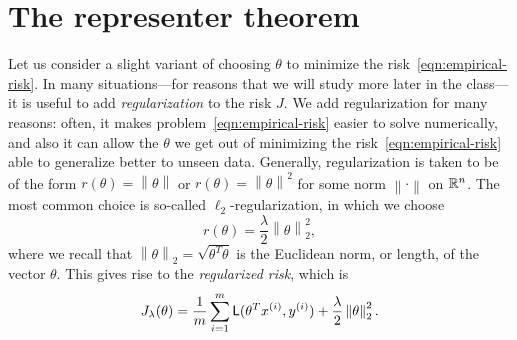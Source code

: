\documentclass{article}
\newcommand{\loss}{\mathsf{L}}
\begin{document}
\section{The representer theorem}

\renewenvironment{proof}{\noindent{\bf Proof}\hspace*{1em}}{\qed\bigskip\\}

\newcommand{\reg}{r}
\newcommand{\norm}[1]{\left\|{#1}\right\|}
\newcommand{\normbigg}[1]{\bigg\|{#1}\bigg\|}
\newcommand{\ltwo}[1]{\norm{#1}_2}
\newcommand{\ltwobigg}[1]{\normbigg{#1}_2}

Let us consider a slight variant of choosing $\theta$ to minimize the
risk~\eqref{eqn:empirical-risk}. In many situations---for reasons that we
will study more later in the class---it is useful to add
\emph{regularization} to the risk $J$. We add regularization for many
reasons: often, it makes problem~\eqref{eqn:empirical-risk} easier to solve
numerically, and also it can allow the $\theta$ we get out of minimizing the
risk~\eqref{eqn:empirical-risk} able to generalize better to unseen data.
Generally, regularization is taken to be of the form
$\reg(\theta) = \norm{\theta}$ or $\reg(\theta) = \norm{\theta}^2$ for
some norm $\norm{\cdot}$ on $\mathbb{R}^n$.
The most common choice is so-called $\ell_2$-regularization, in which
we choose
\begin{equation*}
  \reg(\theta) = \frac{\lambda}{2} \ltwo{\theta}^2,
\end{equation*}
where we recall that $\ltwo{\theta} = \sqrt{\theta^T \theta}$ is the Euclidean
norm, or length, of the vector $\theta$.
This gives rise to the \emph{regularized risk}, which is
\begin{equation}
  \label{eqn:regularized-risk}
  J_\lambda(\theta) = \frac{1}{m} \sum_{i=1}^m \loss(\theta^T \xsi, \ysi)
  + \frac{\lambda}{2} \ltwo{\theta}^2.
\end{equation}
\end{document}
